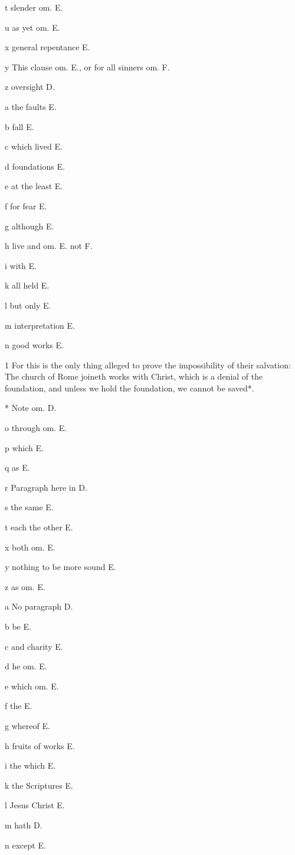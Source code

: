 t
slender om. E.

u
as yet om. E.

x
general repentance E.

y
This clause om. E., or for all sinners om. F.

z
oversight D.

a
the faults E.

b
fall E.

c
which lived E.

d
foundations E.

e
at the least E.

f
for fear E.

g
although E.

h
live and om. E. not F.

i
with E.

k
all held E.

l
but only E.

m
interpretation E.

n
good works E.

1
For this is the only thing alleged to prove the impossibility of their salvation: The church of Rome joineth works with Christ, which is a denial of the foundation, and unless we hold the foundation, we cannot be saved*.

*
Note om. D.

o
through om. E.

p
which E.

q
as E.

r
Paragraph here in D.

s
the same E.

t
each the other E.

x
both om. E.

y
nothing to be more sound E.

z
as om. E.

a
No paragraph D.

b
be E.

c
and charity E.

d
he om. E.

e
which om. E.

f
the E.

g
whereof E.

h
fruits of works E.

i
the which E.

k
the Scriptures E.

l
Jesus Christ E.

m
hath D.

n
except E.


